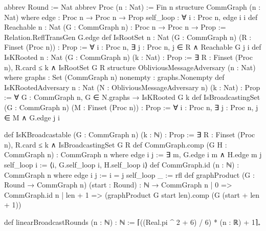 \begin{leanlisting}
\begin{leancode}
abbrev Round := Nat
abbrev Proc (n : Nat) := Fin n
structure CommGraph (n : Nat) where
  edge : Proc n → Proc n → Prop
  self_loop : ∀ i : Proc n, edge i i
def Reachable {n : Nat} (G : CommGraph n) : Proc n → Proc n → Prop :=
  Relation.ReflTransGen G.edge
def IsRootSet {n : Nat} (G : CommGraph n) (R : Finset (Proc n)) : Prop :=
  ∀ i : Proc n, ∃ j : Proc n, j ∈ R ∧ Reachable G j i
def IsKRooted {n : Nat} (G : CommGraph n) (k : Nat) : Prop :=
  ∃ R : Finset (Proc n), R.card ≤ k ∧ IsRootSet G R
structure ObliviousMessageAdversary (n : Nat) where
  graphs : Set (CommGraph n)
  nonempty : graphs.Nonempty
def IsKRootedAdversary {n : Nat} (N : ObliviousMessageAdversary n) (k : Nat) : Prop :=
  ∀ G : CommGraph n, G ∈ N.graphs → IsKRooted G k
def IsBroadcastingSet (G : CommGraph n) (M : Finset (Proc n)) : Prop :=
  ∀ i : Proc n, ∃ j : Proc n, j ∈ M ∧ G.edge j i
\end{leancode}
\begin{leancode}
def IsKBroadcastable (G : CommGraph n) (k : ℕ) : Prop :=
  ∃ R : Finset (Proc n), R.card ≤ k ∧ IsBroadcastingSet G R
def CommGraph.comp (G H : CommGraph n) : CommGraph n where
  edge i j := ∃ m, G.edge i m ∧ H.edge m j
  self_loop i := ⟨i, G.self_loop i, H.self_loop i⟩
def CommGraph.id (n : ℕ) : CommGraph n where
  edge i j := i = j
  self_loop _ := rfl
def graphProduct (G : Round → CommGraph n) (start : Round) : ℕ → CommGraph n
  | 0 => CommGraph.id n
  | len + 1 => (graphProduct G start len).comp (G (start + len + 1))
\end{leancode}
\begin{leancode}
def linearBroadcastRounds (n : ℕ) : ℕ :=
  ⌈((Real.pi ^ 2 + 6) / 6) * (n : ℝ) + 1⌉₊
\end{leancode}
\end{leanlisting}

